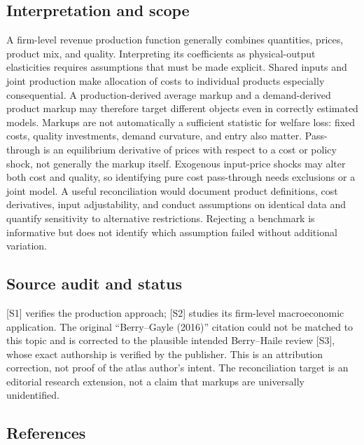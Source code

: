 \documentclass[11pt,a4paper]{article}
\begin{document}
\subsection*{Interpretation and scope}

A firm-level revenue production function generally combines quantities, prices, product mix, and quality. Interpreting its coefficients as physical-output elasticities requires assumptions that must be made explicit. Shared inputs and joint production make allocation of costs to individual products especially consequential. A production-derived average markup and a demand-derived product markup may therefore target different objects even in correctly estimated models. Markups are not automatically a sufficient statistic for welfare loss: fixed costs, quality investments, demand curvature, and entry also matter. Pass-through is an equilibrium derivative of prices with respect to a cost or policy shock, not generally the markup itself. Exogenous input-price shocks may alter both cost and quality, so identifying pure cost pass-through needs exclusions or a joint model. A useful reconciliation would document product definitions, cost derivatives, input adjustability, and conduct assumptions on identical data and quantify sensitivity to alternative restrictions. Rejecting a benchmark is informative but does not identify which assumption failed without additional variation.

\subsection*{Source audit and status}

[S1] verifies the production approach; [S2] studies its firm-level macroeconomic application. The original ``Berry--Gayle (2016)'' citation could not be matched to this topic and is corrected to the plausible intended Berry--Haile review [S3], whose exact authorship is verified by the publisher. This is an attribution correction, not proof of the atlas author's intent. The reconciliation target is an editorial research extension, not a claim that markups are universally unidentified.

\subsection*{References}
\end{document}
